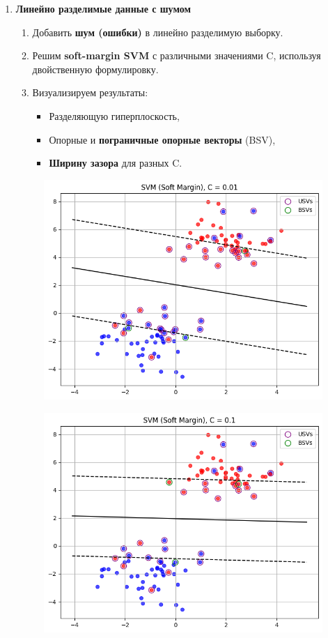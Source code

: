 \begin{enumerate}
\item \textbf{Линейно разделимые данные с шумом}
\begin{enumerate}
    \item Добавить \textbf{шум (ошибки)} в линейно разделимую выборку.
    \item Решим \textbf{soft-margin SVM} с различными значениями C, используя двойственную формулировку.
    \item Визуализируем результаты:
    \begin{itemize}
        \item Разделяющую гиперплоскость,
        \item Опорные и \textbf{пограничные опорные векторы} (BSV),
        \item \textbf{Ширину зазора} для разных C.
    \end{itemize}
\end{enumerate}
    \begin{figure}[H]
        \centering
        \includegraphics[width=0.75\linewidth]{assets/2.1.png}
        \caption {}
    \end{figure}
    \begin{figure}[H]
        \centering
        \includegraphics[width=0.75\linewidth]{assets/2.2.png}

\end{figure}
\end{enumerate}
